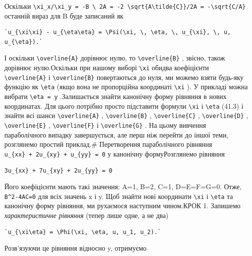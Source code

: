 \documentclass[
  ukrainian,
]{article}
\begin{document}
Оскільки
\texttt{\textbackslash{}xi\_x/\textbackslash{}xi\_y\ =\ -B\ \textbackslash{}\ 2A\ =\ -2\ \textbackslash{}sqrt\{A\textbackslash{}tilde\{C\}\}/2A\ =\ -\textbackslash{}sqrt\{C/A\}}
останній вираз для B буде записаний як

\begin{verbatim}
`u_{\xi\xi} - u_{\eta\eta} = \Psi(\xi, \, \eta, \, u_{\xi}, \, u, u_{\eta}).`
\end{verbatim}

І оскільки \texttt{\textbackslash{}overline\{A\}} дорівнює нулю, то
\texttt{\textbackslash{}overline\{B\}} , звісно, також дорівнює
нулю.Оскільки при нашому виборі \texttt{\textbackslash{}xi} обидва
коефіцієнти \texttt{\textbackslash{}overline\{A\}} і
\texttt{\textbackslash{}overline\{B\}} повертаються до нуля, ми можемо
взяти будь-яку функцію як \texttt{\textbackslash{}eta} (якщо вона не
пропорційна координаті \texttt{\textbackslash{}xi} ). У прикладі можна
вибрати \texttt{\textbackslash{}eta\ =\ y} .Залишається знайти канонічну
форму рівняння в нових координатах. Для цього потрібно просто підставити
формули \texttt{\textbackslash{}xi} і \texttt{\textbackslash{}eta}
(41.3) і знайти всі шанси \texttt{\textbackslash{}overline\{A\}} ,
\texttt{\textbackslash{}overline\{B\}} ,
\texttt{\textbackslash{}overline\{C\}} ,
\texttt{\textbackslash{}overline\{D\}} ,
\texttt{\textbackslash{}overline\{E\}} ,
\texttt{\textbackslash{}overline\{F\}} і
\texttt{\textbackslash{}overline\{G\}} . На цьому вивчення параболічного
випадку завершується, але перш ніж перейти до іншої теми, розглянемо
простий приклад.\# Перетворення параболічного рівняння
\texttt{u\_\{xx\}\ +\ 2u\_\{xy\}\ +\ u\_\{yy\}\ =\ 0} у канонічну
формуРозглянемо рівняння

\begin{verbatim}
3u_{xx} + 7u_{xy} + 2u_{yy} = 0
\end{verbatim}

Його коефіцієнти мають такі значення: A=1, B=2, C=1, D=E=F=G=0. Отже,
\texttt{B\^{}2-4AC=0} для всіх значень x і y. Щоб знайти нові координати
\texttt{\textbackslash{}xi} і \texttt{\textbackslash{}eta} та канонічну
форму рівняння, ми рухаємося наступним чином.КРОК 1. Запишемо
\emph{характеристичне рівняння} (тепер лише одне, а не два)

\begin{verbatim}
`u_{\xi\eta} = \Phi(\xi, \eta, u, u_1, u_2).`
\end{verbatim}

Розв'язуючи це рівняння відносно y, отримуємо
\end{document}
